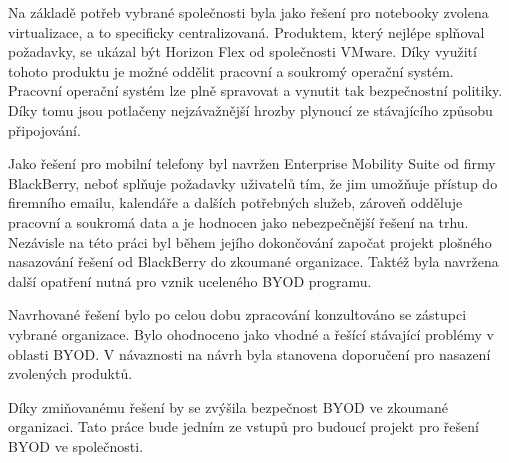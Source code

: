 Na základě potřeb vybrané společnosti byla jako řešení pro notebooky zvolena virtualizace, a to specificky centralizovaná. Produktem, který nejlépe splňoval požadavky, se ukázal být Horizon Flex od společnosti VMware. Díky využití tohoto produktu je možné oddělit pracovní a soukromý operační systém. Pracovní operační systém lze plně spravovat a vynutit tak bezpečnostní politiky. Díky tomu jsou potlačeny nejzávažnější hrozby plynoucí ze stávajícího způsobu připojování.

Jako řešení pro mobilní telefony byl navržen Enterprise Mobility Suite od firmy BlackBerry, neboť splňuje požadavky uživatelů tím, že jim umožňuje přístup do firemního emailu,
kalendáře a dalších potřebných služeb, zároveň odděluje pracovní a soukromá
data a je hodnocen jako nebezpečnější řešení na trhu. Nezávisle na této práci byl během jejího dokončování započat projekt plošného nasazování řešení od BlackBerry do zkoumané organizace. Taktéž byla navržena další opatření nutná pro vznik uceleného BYOD programu.

Navrhované řešení bylo po celou dobu zpracování konzultováno se zástupci vybrané organizace. Bylo ohodnoceno jako vhodné a řešící stávající problémy v oblasti BYOD. V návaznosti na návrh byla stanovena doporučení pro nasazení zvolených produktů.


Díky zmiňovanému řešení by se zvýšila bezpečnost BYOD ve zkoumané organizaci. Tato práce bude jedním ze vstupů pro budoucí projekt pro řešení BYOD ve společnosti.